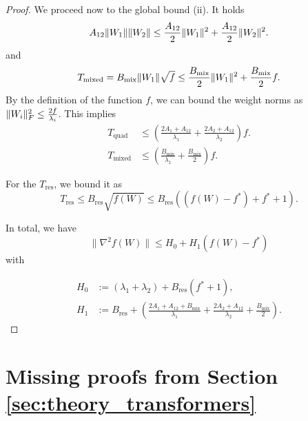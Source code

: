 \documentclass[a4paper,11pt]{article}
\DeclarePairedDelimiter{\norm}{\|}{\|}
\newcommand{\1}{\mathbbm{1}}
\theoremstyle{plain}
\begin{document}
\begin{proof}
We proceed now to the global bound (ii).
It holds
\begin{equation*}
    A_{12} \norm{W_1}\norm{W_2} \le \frac{A_{12}}{2} \norm{W_1}^2 + \frac{A_{12}}{2} \norm{W_2}^2.
\end{equation*}
and
\begin{equation*}
    T_{\text{mixed}} = B_{\text{mix}} \norm{W_1} \sqrt{f} \le \frac{B_{\text{mix}}}{2} \norm{W_1}^2 + \frac{B_{\text{mix}}}{2} f.
\end{equation*}
By the definition of the function $f$, we can bound the weight norms as
$\norm{W_i}_F^2 \le \frac{2 f}{\lambda_i}$. This implies
\begin{align*}
    T_{\text{quad}} &\le \left( \frac{2 A_1 + A_{12}}{\lambda_1} + \frac{2 A_2 + A_{12}}{\lambda_2} \right) f. \\
    T_{\text{mixed}} &\le \left( \frac{B_{\text{mix}}}{\lambda_1} + \frac{B_{\text{mix}}}{2} \right) f.
\end{align*}

For the $T_{\text{res}}$, we bound it as
\begin{equation*}
T_{\text{res}} \leq B_{\text{res}} \sqrt{f(W)} \leq B_{\text{res}} ((f(W)-f^*)+f^*+1). 
\end{equation*}

In total, we have
\begin{equation*}
\|\nabla^2 f(W)\| \leq H_0 + H_1 (f(W)-f^*)
\end{equation*}
with

\begin{align}
\label{eq:CE_regularization_global_constants}
     \nonumber H_0 &:= (\lambda_1 + \lambda_2) + B_{\text{res}} (f^*+1), \\
     H_1 &:= B_{\text{res}} + \left( \frac{2 A_1 + A_{12} + B_{\text{mix}}}{\lambda_1} + \frac{2 A_2 + A_{12}}{\lambda_2} + \frac{B_{\text{mix}}}{2} \right).   
\end{align}

\end{proof}



\section{Missing proofs from Section \ref{sec:theory_transformers}}
\label{app:transformers_proofs}
\end{document}
